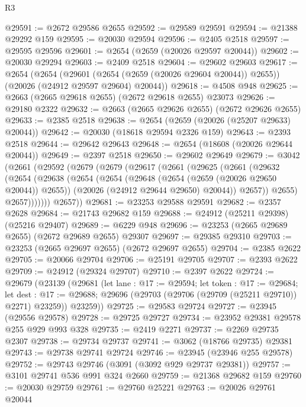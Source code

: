 \begin{lexlean}{R3}
\begin{coremodule}
@29591 := @2672 @29586 @2655
@29592 := @29589 @29591
@29594 := @21388 @29292 @159
@29595 := @20030 @29594
@29596 := @2405 @2518
@29597 := @29595 @29596
@29601 := @2654 (@2659 (@20026 @29597 @20044))
@29602 := @20030 @29294
@29603 := @2409 @2518
@29604 := @29602 @29603
@29617 := @2654
    (@2654
      (@29601 (@2654 (@2659 (@20026 @29604 @20044)) @2655))
      (@20026 (@24912 @29597 @29604) @20044))
@29618 := @4508 @948
@29625 := @2663 (@2665 @29618 @2655) (@2672 @29618 @2655) @23073
@29626 := @29180 @2322
@29632 := @2663 (@2665 @29626 @2655) (@2672 @29626 @2655)
@29633 := @2385 @2518
@29638 := @2654 (@2659 (@20026 (@25207 @29633) @20044))
@29642 := @20030 (@18618 @29594 @2326 @159)
@29643 := @2393 @2518
@29644 := @29642 @29643
@29648 := @2654 (@18608 (@20026 @29644 @20044))
@29649 := @2397 @2518
@29650 := @29602 @29649
@29679 := @3042
    (@2661
      (@29592
        (@2679
          (@2679
            (@29617
              (@2661
                (@29625
                  (@2661
                    (@29632
                      (@2654
                        (@29638
                          (@2654
                            (@2654
                              (@29648 (@2654 (@2659 (@20026 @29650 @20044)) @2655))
                              (@20026 (@24912 @29644 @29650) @20044))
                            @2657))
                        @2655)
                      @2657)))))))
        @2657))
@29681 := @23253 @29588 @29591
@29682 := @2357 @2628
@29684 := @21743 @29682 @159
@29688 := @24912 (@25211 @29398) (@25216 @29407)
@29689 := @6229 @948
@29696 := @23253 (@2665 @29689 @2655) (@2672 @29689 @2655) @29307
@29697 := @29385 @29310
@29703 := @23253 (@2665 @29697 @2655) (@2672 @29697 @2655)
@29704 := @2385 @2622
@29705 := @20066 @29704
@29706 := @25191 @29705
@29707 := @2393 @2622
@29709 := @24912 (@29324 @29707)
@29710 := @2397 @2622
@29724 := @29679
    (@23139
      (@29681
        (let lane : @17 := @29594;
        let token : @17 := @29684;
        let dest : @17 := @29688; @29696 (@29703 (@29706 (@29709 (@25211 @29710)) @2271) @23259))
        @23259))
@29725 := @29583 @29724
@29727 := @23945 (@29556 @29578)
@29728 := @29725 @29727
@29734 := @23952 @29381 @29578 @255 @929 @993 @328
@29735 := @2419 @2271
@29737 := @2269 @29735 @2307
@29738 := @29734 @29737
@29741 := @3062 (@18766 @29735) @29381
@29743 := @29738 @29741 @29724
@29746 := @23945 (@23946 @255 @29578)
@29752 := @29743 @29746 (@3091 (@3092 @929 @29737 @29381))
@29757 := @3101 @29741 @536 @991 @324 @2660
@29759 := @21368 @29682 @159
@29760 := @20030 @29759
@29761 := @29760 @25221
@29763 := @20026 @29761 @20044

\end{coremodule}
\end{lexlean}
